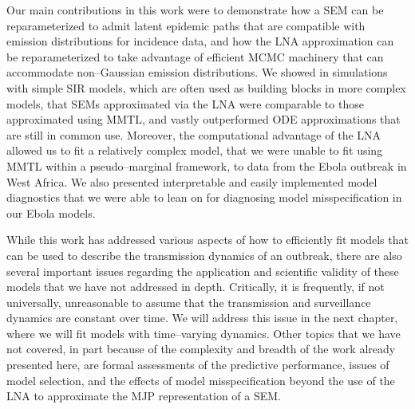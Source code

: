 Our main contributions in this work were to demonstrate how a SEM can be reparameterized to admit latent epidemic paths that are compatible with emission distributions for incidence data, and how the LNA approximation can be reparameterized to take advantage of efficient MCMC machinery that can accommodate non--Gaussian emission distributions. We showed in simulations with simple SIR models, which are often used as building blocks in more complex models, that SEMs approximated via the LNA were comparable to those approximated using MMTL, and vastly outperformed ODE approximations that are still in common use. Moreover, the computational advantage of the LNA allowed us to fit a relatively complex model, that we were unable to fit using MMTL within a pseudo--marginal framework, to data from the Ebola outbreak in West Africa. We also presented interpretable and easily implemented model diagnostics that we were able to lean on for diagnosing model misspecification in our Ebola models.

While this work has addressed various aspects of how to efficiently fit models that can be used to describe the transmission dynamics of an outbreak, there are also several important issues regarding the application and scientific validity of these models that we have not addressed in depth. Critically, it is frequently, if not universally, unreasonable to assume that the transmission and surveillance dynamics are constant over time. We will address this issue in the next chapter, where we will fit models with time--varying dynamics. Other topics that we have not covered, in part because of the complexity and breadth of the work already presented here, are formal assessments of the predictive performance, issues of model selection, and the effects of model misspecification beyond the use of the LNA to approximate the MJP representation of a SEM.